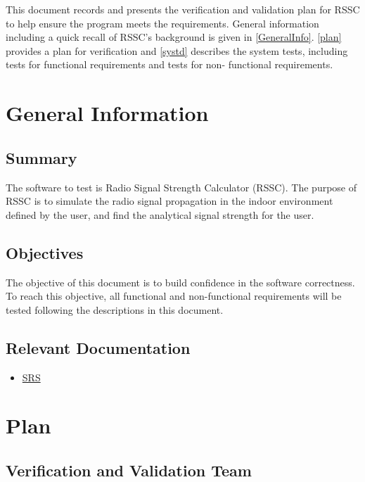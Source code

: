 \documentclass[12pt, titlepage]{article}
\begin{document}
This document records and presents the verification and validation plan for RSSC
to help ensure the program meets the requirements. General information including
a quick recall of RSSC's background is given in \autoref{GeneralInfo}. 
\autoref{plan} provides a plan for verification and \autoref{systd} describes 
the system tests, including tests for functional requirements and tests for non-
functional requirements.


\section{General Information}
\label{GeneralInfo}

\subsection{Summary}

The software to test is Radio Signal Strength Calculator (RSSC). The purpose of
RSSC is to simulate the radio signal propagation in the indoor environment defined
by the user, and find the analytical signal strength for the user. 

\subsection{Objectives}

The objective of this document is to build confidence in the software correctness.
To reach this objective, all functional and non-functional requirements will be
tested following the descriptions in this document. 

\subsection{Relevant Documentation}

\begin{itemize}
	\item 
	\href{https://github.com/XingzhiMac/CAS741-Proj/blob/master/docs/SRS/SRS.pdf}
	{SRS} 
\end{itemize}

\section{Plan}\label{plan}
	
\subsection{Verification and Validation Team}
\end{document}
